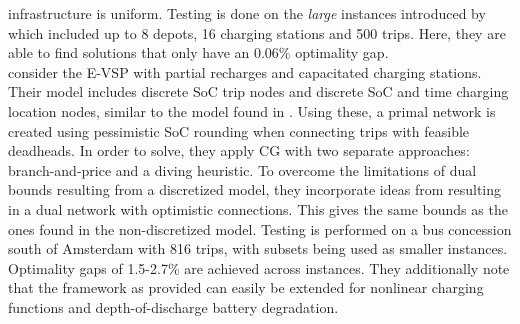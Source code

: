 \documentclass[]{article}
\begin{document}
infrastructure is uniform. Testing is done on the \textit{large}
instances introduced by \citet{Wen2016} which included up to 8
depots, 16 charging stations and 500 trips. Here, they are able to find
solutions that only have an 0.06\% optimality gap. \\
\citet{deVos2024} consider the E-VSP with partial recharges and capacitated charging stations. Their model includes discrete SoC trip nodes and discrete SoC and time charging location nodes, similar to the model found in \citet{Zhang2021}. Using these, a primal network is created using pessimistic SoC rounding when connecting trips with feasible deadheads. In order to solve, they apply CG with two separate approaches:
branch-and-price and a diving heuristic. To overcome the limitations of dual
bounds resulting from a discretized model, they incorporate ideas from \citet{Boland2017} resulting in a dual network with optimistic connections. This gives the same bounds as the ones found in the
non-discretized model. Testing is performed on a bus concession south of
Amsterdam with 816 trips, with subsets being used as smaller instances.
Optimality gaps of 1.5-2.7\% are achieved across instances. They additionally
note that the framework as provided can easily be extended for nonlinear
charging functions and depth-of-discharge battery degradation. 
\end{document}
